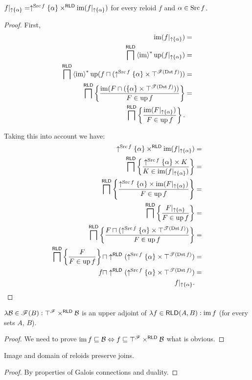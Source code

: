 \begin{thm}
$f|_{\uparrow\{\alpha\}}=\uparrow^{\operatorname{Src} f}\{\alpha\}\times^{\mathsf{RLD}}\operatorname{im}(f|_{\uparrow\{\alpha\}})$
for every reloid $f$ and $\alpha\in\operatorname{Src} f$.\end{thm}
\begin{proof}
First,
\begin{align*}
\operatorname{im}(f|_{\uparrow \{\alpha\}}) & =\\
\bigsqcap^{\mathsf{RLD}}\left\langle \operatorname{im}\right\rangle ^{\ast}\operatorname{up}(f|_{\uparrow \{\alpha\}}) & =\\
\bigsqcap^{\mathsf{RLD}}\left\langle \operatorname{im}\right\rangle ^{\ast}\operatorname{up}(f\sqcap(\uparrow^{\operatorname{Src} f}\{\alpha\}\times\top^{\mathscr{F}(\operatorname{Dst} f)})) & =\\
\bigsqcap^{\mathsf{RLD}}\left\{ \frac{\operatorname{im}(F\cap(\{\alpha\}\times\top^{\mathscr{T}(\operatorname{Dst} f)}))}{F\in\operatorname{up} f}\right\} & =\\
\bigsqcap^{\mathsf{RLD}}\left\{ \frac{\operatorname{im}(F|_{\uparrow \{\alpha\}})}{F\in\operatorname{up} f}\right\}.
\end{align*}


Taking this into account we have:
\begin{align*}
\uparrow^{\operatorname{Src} f}\{\alpha\}\times^{\mathsf{RLD}}\operatorname{im}(f|_{\uparrow \{\alpha\}}) & =\\
\bigsqcap^{\mathsf{RLD}}\left\{ \frac{\uparrow^{\operatorname{Src} f}\{\alpha\}\times K}{K\in\operatorname{im}(f|_{\uparrow \{\alpha\}})}\right\} & =\\
\bigsqcap^{\mathsf{RLD}}\left\{ \frac{\uparrow^{\operatorname{Src} f}\{\alpha\}\times\operatorname{im}(F|_{\uparrow \{\alpha\}})}{F\in\operatorname{up} f}\right\} & =\\
\bigsqcap^{\mathsf{RLD}}\left\{ \frac{F|_{\uparrow \{\alpha\}}}{F\in\operatorname{up} f}\right\} & =\\
\bigsqcap^{\mathsf{RLD}}\left\{ \frac{F\sqcap(\uparrow^{\operatorname{Src} f}\{\alpha\}\times\top^{\mathscr{T}(\operatorname{Dst} f)})}{F\in\operatorname{up} f}\right\} & =\\
\bigsqcap^{\mathsf{RLD}}\left\{ \frac{F}{F\in\operatorname{up} f}\right\}\sqcap\uparrow^{\mathsf{RLD}}(\uparrow^{\operatorname{Src} f}\{\alpha\}\times\top^{\mathscr{T}(\operatorname{Dst} f)}) & =\\
f\sqcap\uparrow^{\mathsf{RLD}}(\uparrow^{\operatorname{Src} f}\{\alpha\}\times\top^{\mathscr{T}(\operatorname{Dst} f)}) & =\\
f|_{\uparrow \{\alpha\}}.
\end{align*}
\end{proof}
\begin{lem}
$\lambda\mathcal{B}\in\mathscr{F}(B):\top^{\mathscr{F}}\times^{\mathsf{RLD}}\mathcal{B}$
is an upper adjoint of $\lambda f\in\mathsf{RLD}(A,B):\operatorname{im} f$ (for
every sets $A$, $B$).\end{lem}
\begin{proof}
We need to prove $\operatorname{im} f\sqsubseteq\mathcal{B}\Leftrightarrow f\sqsubseteq\top^{\mathscr{F}}\times^{\mathsf{RLD}}\mathcal{B}$
what is obvious.\end{proof}
\begin{cor}
\label{rld-dom-join}Image and domain of reloids preserve joins.\end{cor}
\begin{proof}
By properties of Galois connections and duality.
\end{proof}

